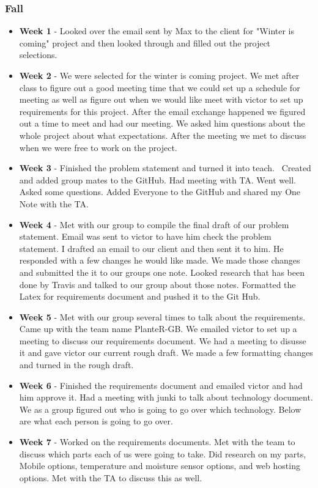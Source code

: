\documentclass[onecolumn, draftclsnofoot,10pt, compsoc]{IEEEtran}
\begin{document}
			\subsubsection{Fall}
				\begin{itemize}
					\item \textbf{Week 1} - Looked over the email sent by Max to the client for "Winter is coming" project and then looked through and filled out the project selections. 
					\item \textbf{Week 2} -  We were selected for the winter is coming project. We met after class to figure out a good meeting time that we could set up a schedule for meeting as well as figure out when we would like meet with victor to set up requirements for this project. After the email exchange happened we figured out  a time to meet and had our meeting. We asked him questions about the whole project about what expectations. After the meeting we met to discuss when we were free to work on the project. 
					\item \textbf{Week 3} - Finished the problem statement and turned it into teach.  Created and added group mates to the GitHub. Had meeting with TA. Went well. Asked some questions. Added Everyone to the GitHub and shared my One Note with the TA.
					\item \textbf{Week 4} - Met with our group to compile the final draft of our problem statement.  Email was sent to victor to have him check the problem statement.  I drafted an email to our client and then sent it to him. He responded with a few changes he would like made. We made those changes and submitted the it to our groups one note.  Looked research that has been done by Travis and talked to our group about those notes. Formatted the Latex for requirements document and pushed it to the Git Hub.  
					\item \textbf{Week 5} - Met with our group several times to talk about the requirements. Came up with the team name PlanteR-GB. We emailed victor to set up a meeting to discuss our requirements document. We had a meeting to disusse it and gave victor our current rough draft.  We made a few formatting changes and turned in the rough draft. 
					\item \textbf{Week 6} - Finished the requirements document and emailed victor and had him approve it. Had a meeting with junki to talk about technology document. We as a group figured out who is going to go over which technology.  Below are what each person is going to go over.  
					\item \textbf{Week 7} - Worked on the requirements documents. Met with the team to discuss which parts each of us were going to take. Did research on my parts, Mobile options, temperature and moisture sensor options, and web hosting options.  Met with the TA to discuss this as well.  

\end{itemize}
\end{document}
